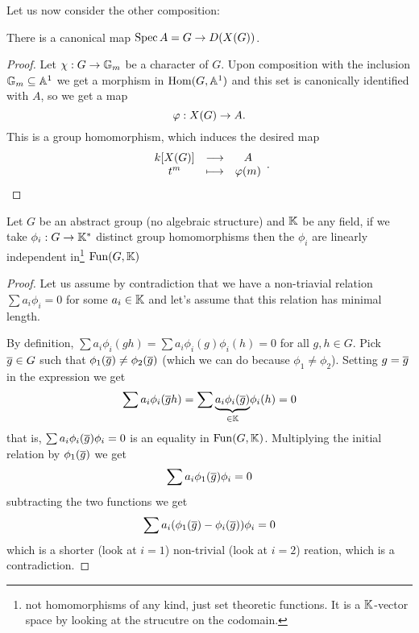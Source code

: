 Let us now consider the other composition:

\begin{remark}
There is a canonical map $\operatorname{Spec} A=G\to D(X(G))$.
\end{remark}
\begin{proof}
Let $\chi:G\to \mathbb{G}_m$ be a character of $G$. Upon composition with the inclusion $\mathbb{G}_m\subseteq \mathbb{A}^1$ we get a morphism in $\operatorname{Hom}(G,\mathbb{A}^1)$ and this set is canonically identified with $A$, so we get a map
\[\varphi:X(G)\to A.\] 
This is a group homomorphism, which induces the desired map
\[\begin{array}{ccc} {k[X(G)]} & \longrightarrow & {A}\\ {t^m} & \longmapsto & {\varphi(m)} \end{array}.\]
\end{proof}

\begin{lemma}
Let $G$ be an abstract group (no algebraic structure) and $\mathbb{K}$ be any field, if we take $\phi_i:G\to \mathbb{K}^\ast$ distinct group homomorphisms then the $\phi_i$ are linearly independent in\footnote{not homomorphisms of any kind, just set theoretic functions. It is a $\mathbb{K}$-vector space by looking at the strucutre on the codomain.} $\operatorname{Fun}(G,\mathbb{K})$
\end{lemma}
\begin{proof}
Let us assume by contradiction that we have a non-triavial relation $\sum a_i\phi_i=0$ for some $a_i\in \mathbb{K}$ and let's assume that this relation has minimal length.

By definition, $\sum a_i\phi_i(gh)=\sum a_i\phi_i(g)\phi_i(h)=0$ for all $g,h\in G$. Pick $\overline{g}\in G$ such that $\phi_1(\overline{g})\neq \phi_2(\overline{g})$ (which we can do because $\phi_1\neq \phi_2$). Setting $g=\overline{g}$ in the expression we get
\[\sum a_i\phi_i(\overline{g}h)=\sum \underset{\in \mathbb{K}}{\underbrace{a_i\phi_i(\overline{g})}}\phi_i(h)=0\]
that is, $\sum {a_i\phi_i(\overline{g})}\phi_i=0$ is an equality in $\operatorname{Fun}(G,\mathbb{K})$. Multiplying the initial relation by $\phi_1(\overline{g})$ we get
\[\sum a_i\phi_1(\overline{g})\phi_i=0\]
subtracting the two functions we get
\[\sum a_i(\phi_1(\overline{g})-\phi_i(\overline{g}))\phi_i=0\]
which is a shorter (look at $i=1$) non-trivial (look at $i=2$) reation, which is a contradiction.
\end{proof}

